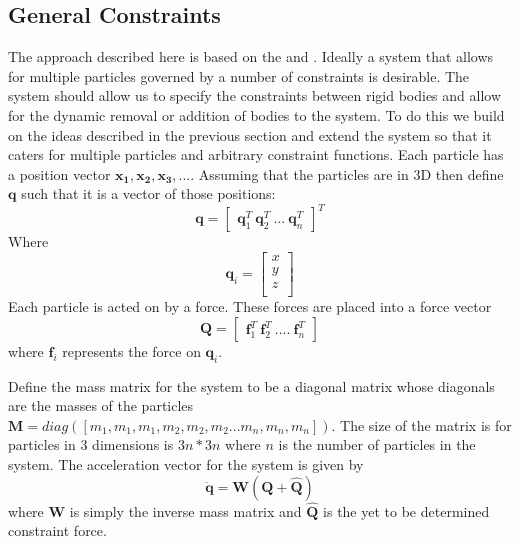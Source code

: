 \subsection{General Constraints}
\label{SubSec:GeneralConstraints}
The approach described here is based on the \cite{PBMNotes} and
\cite{Otte}. Ideally a system that allows for multiple particles governed by a
number of constraints is desirable. The system should allow us to specify the
constraints between rigid bodies and allow for the dynamic removal or addition
of bodies to the system. To do this we build on the ideas described in the
previous section and extend the system so that it caters for multiple particles
and arbitrary constraint functions. Each particle has a position vector
$\mathbf{x_1, x_2, x_3, ... }$. Assuming that the particles are in 3D then
define $\mathbf{q}$ such that it is a vector of those positions:
\[
    \mathbf{q} = 
    \begin{bmatrix}
        \mathbf{q}_{1}^T \: \mathbf{q}_{2}^T \: ... \: \mathbf{q}_{n}^T
    \end{bmatrix}^T
\]
Where
\[
    \mathbf{q}_i = 
    \begin{bmatrix}
        x\\
        y\\
        z\\
    \end{bmatrix}
\]
Each particle is acted on by a force. These forces are placed into a force vector
\[
    \mathbf{Q} =
    \begin{bmatrix}
        \mathbf{f}_1^T \: \mathbf{f}_2^T \: .... \: \mathbf{f}_n^T
    \end{bmatrix}
\]
where $\mathbf{f}_i$ represents the force on $\mathbf{q}_i$.


Define the mass matrix for the system to be a diagonal matrix whose diagonals
are the masses of the particles $\mathbf{M}=diag([m_1, m_1, m_1, m_2, m_2, m_2...m_n,
m_n, m_n])$. The size of the matrix is for particles in 3 dimensions is $3n*3n$
where $n$ is the number of particles in the system. The acceleration vector for
the system is given by    
\[
    \mathbf{\ddot{q}} = \mathbf{W}\left(\mathbf{Q} + \mathbf{\hat{Q}}\right) 
\]
where $\mathbf{W}$ is simply the inverse mass matrix and $\mathbf{\hat{Q}}$ is
the yet to be determined constraint force.

